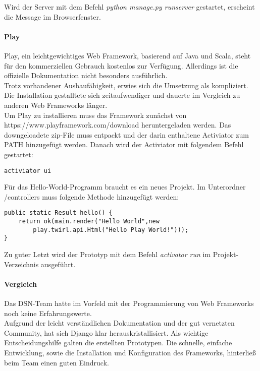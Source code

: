 Wird der Server mit dem Befehl \textit{python manage.py runserver} gestartet, erscheint die Message im Browserfenster.

\paragraph{Play}
Play, ein leichtgewichtiges Web Framework, basierend auf Java und Scala, steht für den kommerziellen Gebrauch kostenlos zur Verfügung. Allerdings ist die offizielle Dokumentation nicht besonders ausführlich.\\
Trotz vorhandener Ausbaufähigkeit, erwies sich die Umsetzung als kompliziert. Die Installation gestalltete sich zeitaufwendiger und dauerte im Vergleich zu anderen Web Frameworks länger.\cite{PLAY}\\

Um Play zu installieren muss das Framework zunächst von\\
https://www.playframework.com/download heruntergeladen werden. Das downgeloadete zip-File muss entpackt und der darin enthaltene Activiator zum PATH hinzugefügt werden. Danach wird der Activiator mit folgendem Befehl gestartet\cite{PLAYCON}:
\begin{lstlisting}[caption={Konifiguration von Play\cite{PLAYCON}}]
activiator ui
\end{lstlisting}

Für das \grqq{}Hello-World\grqq{}-Programm braucht es ein neues Projekt. Im Unterordner /controllers muss folgende Methode hinzugefügt werden:

\begin{lstlisting}[caption={Play Hello-World\cite{PLAYCON}}]
public static Result hello() {
	return ok(main.render("Hello World",new
		play.twirl.api.Html("Hello Play World!")));
}
\end{lstlisting}

Zu guter Letzt wird der Prototyp mit dem Befehl \textit{activator run} im Projekt-Verzeichnis ausgeführt.

\paragraph{Vergleich}
Das DSN-Team hatte im Vorfeld mit der Programmierung von Web Frameworks noch keine Erfahrungswerte. \\
Aufgrund der leicht verständlichen Dokumentation und der gut vernetzten Community, hat sich Django klar herauskristallisiert. Als wichtige Entscheidungshilfe galten die erstellten Prototypen. Die schnelle, einfache Entwicklung, sowie die Installation und Konfiguration des Frameworks, hinterließ beim Team einen guten Eindruck.

